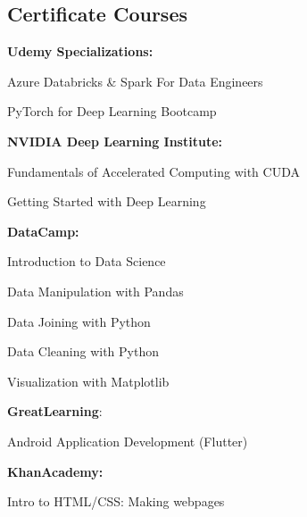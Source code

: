 \documentclass[]{m abbas resume' 2022}
\begin{document}
\begin{minipage}[t]{0.50\textwidth}
	\subsection{Certificate Courses}
	\textbf{Udemy Specializations:}
	\begin{tightemize}
		\item Azure Databricks \& Spark For Data Engineers
		\item PyTorch for Deep Learning Bootcamp
	\end{tightemize}
	\textbf{NVIDIA Deep Learning Institute:}
	\begin{tightemize}
		\item Fundamentals of Accelerated Computing with CUDA
		\item Getting Started with Deep Learning
	\end{tightemize}
	\textbf{DataCamp:}
	\begin{tightemize}
		\item Introduction to Data Science
		\item Data Manipulation with Pandas
		\item Data Joining with Python
		\item Data Cleaning with Python
		\item Visualization with Matplotlib
	\end{tightemize}
	\textbf{GreatLearning}:
	\begin{tightemize}
		\item Android Application Development (Flutter)
	\end{tightemize}
	\textbf{KhanAcademy:}
	\begin{tightemize}
		\item Intro to HTML/CSS: Making webpages
	\end{tightemize}
	\sectionsep


\end{minipage}
\end{document}
